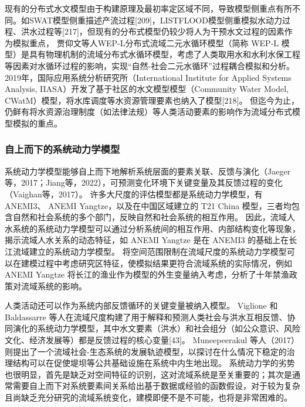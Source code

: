 现有的分布式水文模型由于构建原理及最初率定区域不同，导致模型侧重点有所不同。如SWAT模型侧重描述产流过程[209]，LISTFLOOD模型侧重模拟水动力过程、洪水过程等[217]，但现有的分布式模型仍较少将人为干预水文过程的因素作为模拟重点，
贾仰文等人WEP-L分布式流域二元水循环模型（简称 WEP-L 模型）是具有物理机制的流域分布式水循环模型，考虑了人类取用水和水利水保工程等因素对水循环过程的影响，实现“自然-社会二元水循环”过程耦合模拟和分析。 %
2019年，国际应用系统分析研究所（International Institute for Applied Systems Analysis, IIASA）开发了基于社区的水文模型模型（Community Water Model, CWatM）模型，将水库调度等水资源管理要素也纳入了模型[218]。
但迄今为止，仍鲜有将水资源治理制度（如法律法规）等人类活动要素的影响作为流域分布式模型模拟的重点。

\subsubsection*{自上而下的系统动力学模型}

系统动力学模型能够自上而下地解析系统层面的要素关联、反馈与演化（Jaeger等，2017；Jiang等，2022），可预测变化环境下关键变量及其反馈过程的变化（Vaighan等，2017）。
许多大尺度的评估模型都是系统动力学模型，有 ANEMI3、 ANEMI Yangtze，以及在中国区域建立的 T21 China 模型，三者均包含自然和社会系统的多个部门，反映自然和社会系统的相互作用。
因此，流域人水系统的系统动力学模型可以通过分析系统间的相互作用、内部结构变化等现象，揭示流域人水关系的动态特征，如 ANEMI Yangtze 是在 ANEMI3 的基础上在长江流域建立的系统动力学模型。
将空间范围限制在流域尺度的系统动力学模型可以在建模过程中考虑研究区特征，使模拟结果更符合流域系统的实际情况，例如 ANEMI Yangtze 将长江的渔业作为模型的外生变量纳入考虑，分析了十年禁渔政策对流域系统的影响。 %

人类活动还可以作为系统内部反馈循环的关键变量被纳入模型。
Viglione 和 Baldassarre 等人在流域尺度构建了用于解释和预测人类社会与洪水互相反馈、协同演化的系统动力学模型，其中水文要素（洪水）和社会组分（如公众意识、风险文化、经济发展等）都是反馈过程的核心变量[43]。
Muneepeerakul 等人（2017）则提出了一个流域社会-生态系统的发展轨迹模型，以探讨在什么情况下稳定的治理结构可以在促使堤坝等公共基础设施在系统中内生地出现\cite{muneepeerakul2017}。
系统动力学的劣势也很明显，首先是缺乏对空间特征的识别，这对流域系统是至关重要的；其次是通常需要自上而下对系统要素间关系给出基于数据或经验的函数假设，对于较为复杂且尚缺乏充分研究的流域系统变化，建模即便不是不可能，也将是非常困难的。

